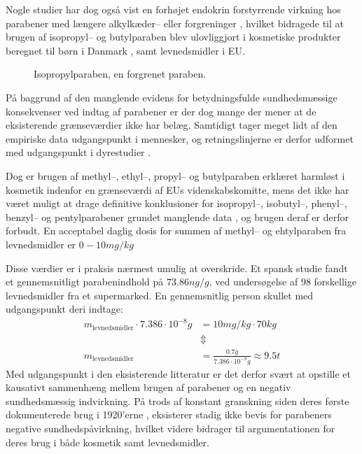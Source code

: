     Nogle studier har dog også vist en forhøjet endokrin forstyrrende virkning hos parabener med længere alkylkæder-- eller forgreninger \parencite{Ebru2013}, hvilket bidragede til at brugen af isopropyl-- og butylparaben blev ulovliggjort i kosmetiske produkter beregnet til børn i Danmark \parencite{Milj2013}, samt levnedsmidler i EU.
    \begin{figure}[H]\centering
        \caption{Isopropylparaben, en forgrenet paraben.}
    \end{figure}
    På baggrund af den manglende evidens for betydningsfulde sundhedsmæssige konsekvenser ved indtag af parabener er der dog mange der mener at de eksisterende grænseværdier \parencite{Euro2011} ikke har belæg. Samtidigt tager meget lidt af den empiriske data udgangspunkt i mennesker, og retningslinjerne er derfor udformet med udgangspunkt i dyrestudier \parencite{Emma2016}.

    Dog er brugen af methyl--, ethyl--, propyl-- og butylparaben erklæret harmløst i kosmetik indenfor en grænseværdi af EUs videnskabskomitte, mens det ikke har været muligt at drage definitive konklusioner for isopropyl--, isobutyl--, phenyl--, benzyl-- og pentylparabener grundet manglende data \parencite{Henr2013}, og brugen deraf er derfor forbudt. En acceptabel daglig dosis for summen af methyl-- og ehtylparaben fra levnedsmidler er $0-10\si{mg\per kg}$

    Disse værdier er i praksis nærmest umulig at overskride. Et spansk studie \parencite{Yola2020} fandt et gennemsnitligt parabenindhold på $73.86\si{ng\per g}$, ved undersøgelse af 98 forskellige levnedsmidler fra et supermarked. En gennemsnitlig person skullet med udgangspunkt deri  indtage:
    \begin{align*}
        m_{\text{levnedsmidler}}\cdot 7.386 \cdot 10^{-8}\si{g}&=10\si{mg\per kg} \cdot 70\si{kg} \\
        &\Updownarrow \\
        m_{\text{levnedsmidler}}&=\frac{0.7\si{g}}{7.386\cdot 10^{-8}\si{g}}\approx 9.5\si{t}
    \end{align*}
    Med udgangspunkt i den eksisterende litteratur er det derfor svært at opstille et kausativt sammenhæng mellem brugen af parabener og en negativ sundhedsmæssig indvirkning. På trods af konstant granskning siden deres første dokumenterede brug i 1920'erne \parencite{Mary1984}, eksisterer stadig ikke bevis for parabeners negative sundhedspåvirkning, hvilket videre bidrager til argumentationen for deres brug i både kosmetik samt levnedsmidler. 

